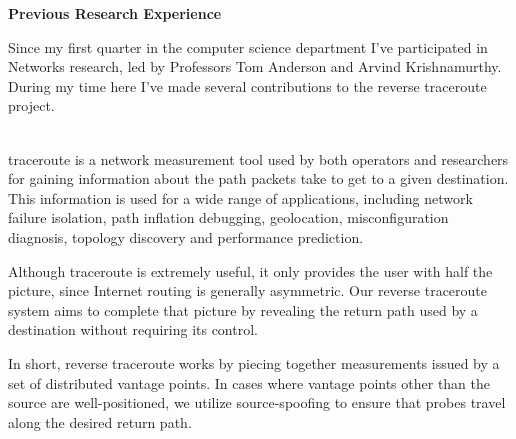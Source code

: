 \documentclass[12pt]{article}	%
\begin{document}
\begin{center}
{ \bf Previous Research Experience } 
\end{center}



Since my first quarter in the computer science department I've participated in
Networks research, led by Professors Tom Anderson and Arvind Krishnamurthy.
During my time here I've made several contributions to the reverse traceroute
project.

 \\
\indent traceroute is a network measurement tool used by both operators and
researchers for gaining information about the path
packets take to get to a given destination. This information is used for a
wide range of applications, including network failure isolation, path
inflation debugging, geolocation, misconfiguration diagnosis, topology
discovery and performance prediction.

Although traceroute is extremely useful, it only provides the user with
half the picture, since Internet routing is generally asymmetric. Our reverse traceroute
system aims to complete that picture by revealing the return path
used by a destination without requiring its control.



In short, reverse traceroute works by piecing together measurements issued by a set of
distributed vantage points. In cases where vantage points other than the
source are well-positioned, we utilize source-spoofing to ensure that probes
travel along the desired return path.
\end{document}
